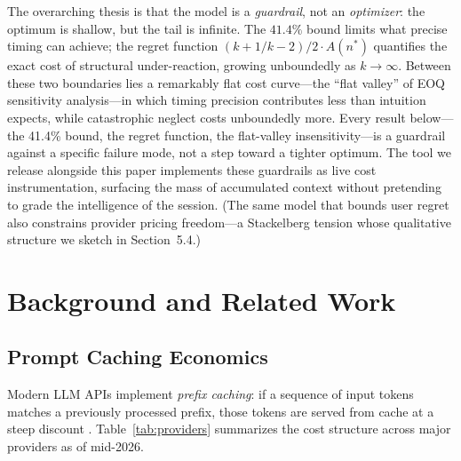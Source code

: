 \documentclass[11pt]{article}
\theoremstyle{definition}
\theoremstyle{remark}
\begin{document}
The overarching thesis is that the model is a \emph{guardrail}, not an \emph{optimizer}: the optimum is shallow, but the tail is infinite. The $41.4\%$ bound limits what precise timing can achieve; the regret function $(k+1/k-2)/2\cdot A(n^*)$ quantifies the exact cost of structural under-reaction, growing unboundedly as $k\to\infty$. Between these two boundaries lies a remarkably flat cost curve---the ``flat valley'' of EOQ sensitivity analysis---in which timing precision contributes less than intuition expects, while catastrophic neglect costs unboundedly more. Every result below---the 41.4\% bound, the regret function, the flat-valley insensitivity---is a guardrail against a specific failure mode, not a step toward a tighter optimum. The tool we release alongside this paper implements these guardrails as live cost instrumentation, surfacing the mass of accumulated context without pretending to grade the intelligence of the session. (The same model that bounds user regret also constrains provider pricing freedom---a Stackelberg tension whose qualitative structure we sketch in Section~5.4.)

\section{Background and Related Work}

\subsection{Prompt Caching Economics}

Modern LLM APIs implement \emph{prefix caching}: if a sequence of input tokens matches a previously processed prefix, those tokens are served from cache at a steep discount \citep{anthropic2025caching}. Table~\ref{tab:providers} summarizes the cost structure across major providers as of mid-2026.
\end{document}
